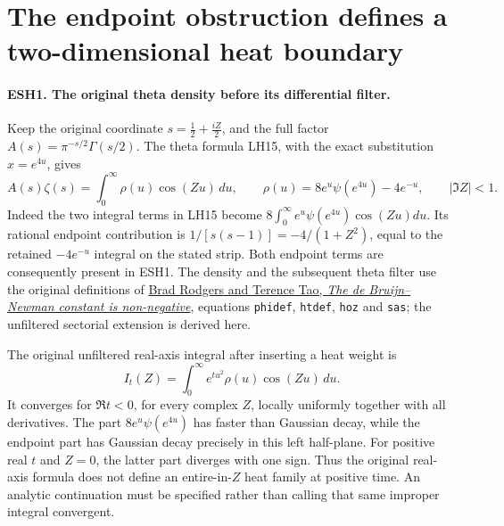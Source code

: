 \section{The endpoint obstruction defines a two-dimensional heat boundary}
\label{sec:endpoint-sectorial-heat}

\paragraph{ESH1. The original theta density before its differential filter.}
Keep the original coordinate \(s=\tfrac12+\tfrac{iZ}{2}\), and
the full factor \(A(s)=\pi^{-s/2}\Gamma(s/2)\). The theta
formula LH15, with the exact substitution \(x=e^{4u}\), gives
\[
 A(s)\zeta(s)=\int_0^\infty\rho(u)\cos(Zu)\,du,\qquad
 \rho(u)=8e^u\psi(e^{4u})-4e^{-u},\qquad |\Im Z|<1.
                                                               \tag{ESH1}
\]
Indeed the two integral terms in LH15 become
\(8\int_0^\infty e^u\psi(e^{4u})\cos(Zu)du\).
Its rational endpoint contribution is
\(1/[s(s-1)]=-4/(1+Z^2)\), equal to the retained
\(-4e^{-u}\) integral on the stated strip. Both endpoint
terms are consequently present in ESH1. The density and the
subsequent theta filter use the original definitions of
\href{https://arxiv.org/abs/1801.05914v5}{Brad Rodgers and
Terence Tao, \emph{The de Bruijn--Newman constant is non-negative}},
equations \texttt{phidef}, \texttt{htdef}, \texttt{hoz} and
\texttt{sas}; the unfiltered sectorial extension is derived here.

The original unfiltered real-axis integral after inserting a
heat weight is
\[
 I_t(Z)=\int_0^\infty e^{tu^2}\rho(u)\cos(Zu)\,du.
                                                               \tag{ESH2}
\]
It converges for \(\Re t<0\), for every complex \(Z\),
locally uniformly together with all derivatives. The part
\(8e^u\psi(e^{4u})\) has faster than Gaussian decay, while
the endpoint part has Gaussian decay precisely in this left
half-plane. For positive real \(t\) and \(Z=0\), the latter
part diverges with one sign. Thus the original real-axis formula
does not define an entire-in-\(Z\) heat family at positive time.
An analytic continuation must be specified rather than calling
that same improper integral convergent.

